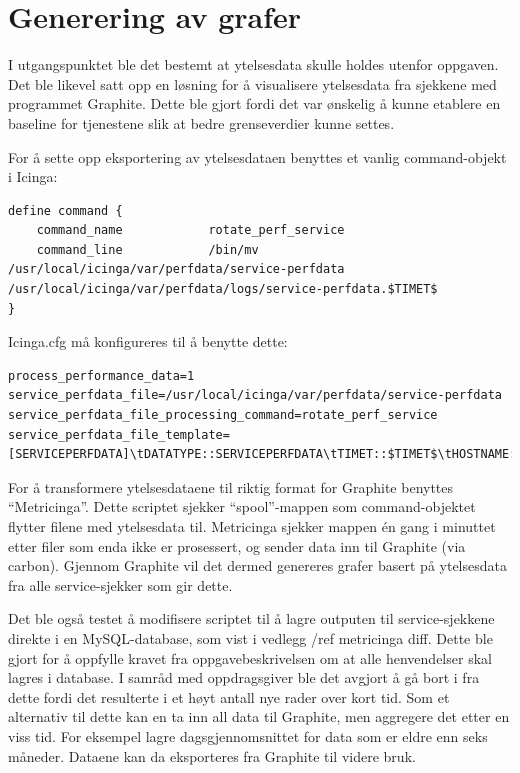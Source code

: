 \section{Generering av grafer}
I utgangspunktet ble det bestemt at ytelsesdata skulle holdes utenfor oppgaven. Det ble likevel satt opp en løsning for å visualisere ytelsesdata fra sjekkene med programmet Graphite\cite{graphite}. Dette ble gjort fordi det var ønskelig å kunne etablere en baseline for tjenestene slik at bedre grenseverdier kunne settes.

For å sette opp eksportering av ytelsesdataen benyttes et vanlig command-objekt i Icinga:

\begin{lstlisting}[style=example]
define command {
    command_name            rotate_perf_service
    command_line            /bin/mv /usr/local/icinga/var/perfdata/service-perfdata /usr/local/icinga/var/perfdata/logs/service-perfdata.$TIMET$
}
\end{lstlisting}
 Icinga.cfg må konfigureres til å benytte dette:

\begin{lstlisting}[style=example]
process_performance_data=1
service_perfdata_file=/usr/local/icinga/var/perfdata/service-perfdata
service_perfdata_file_processing_command=rotate_perf_service
service_perfdata_file_template=[SERVICEPERFDATA]\tDATATYPE::SERVICEPERFDATA\tTIMET::$TIMET$\tHOSTNAME::$HOSTNAME$\tSERVICEDESC::$SERVICEDESC$\tSERVICEPERFDATA::$SERVICEPERFDATA$service_perfdata_file_processing_interval=200
\end{lstlisting}

For å transformere ytelsesdataene til riktig format for Graphite benyttes ``Metricinga''\cite{metricinga}. Dette scriptet sjekker ``spool''-mappen som command-objektet flytter filene med ytelsesdata til. Metricinga sjekker mappen én gang i minuttet etter filer som enda ikke er prosessert, og sender data inn til Graphite (via carbon). Gjennom Graphite vil det dermed genereres grafer basert på ytelsesdata fra alle service-sjekker som gir dette.

Det ble også testet å modifisere scriptet til å lagre outputen til service-sjekkene direkte i en MySQL-database, som vist i vedlegg /ref metricinga diff. Dette ble gjort for å oppfylle kravet fra oppgavebeskrivelsen om at alle henvendelser skal lagres i database. I samråd med oppdragsgiver ble det avgjort å gå bort i fra dette fordi det resulterte i et høyt antall nye rader over kort tid. Som et alternativ til dette kan en ta inn all data til Graphite, men aggregere det etter en viss tid. For eksempel lagre dagsgjennomsnittet for data som er eldre enn seks måneder. Dataene kan da eksporteres fra Graphite til videre bruk.

